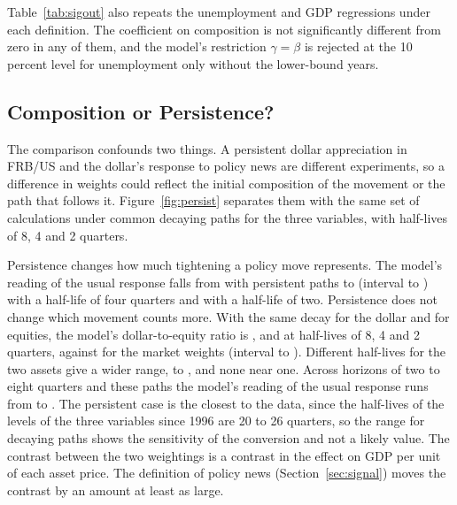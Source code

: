 \documentclass[11pt]{article}
\begin{document}
\begin{appendices}


Table~\ref{tab:sigout} also repeats the unemployment and GDP regressions under each definition. The coefficient on composition is not significantly different from zero in any of them, and the model's restriction $\gamma=\beta$ is rejected at the 10 percent level for unemployment only without the lower-bound years.


\subsection{Composition or Persistence?}\label{sec:persist}
The comparison confounds two things. A persistent dollar appreciation in FRB/US and the dollar's response to policy news are different experiments, so a difference in weights could reflect the initial composition of the movement or the path that follows it. Figure~\ref{fig:persist} separates them with the same set of calculations under common decaying paths for the three variables, with half-lives of 8, 4 and 2 quarters.

Persistence changes how much tightening a policy move represents. The model's reading of the usual response falls from  with persistent paths to  (interval  to ) with a half-life of four quarters and  with a half-life of two. Persistence does not change which movement counts more. With the same decay for the dollar and for equities, the model's dollar-to-equity ratio is ,  and  at half-lives of 8, 4 and 2 quarters, against  for the market weights (interval  to ). Different half-lives for the two assets give a wider range,  to , and none near one. Across horizons of two to eight quarters and these paths the model's reading of the usual response runs from  to . The persistent case is the closest to the data, since the half-lives of the levels of the three variables since 1996 are 20 to 26 quarters, so the range for decaying paths shows the sensitivity of the conversion and not a likely value. The contrast between the two weightings is a contrast in the effect on GDP per unit of each asset price. The definition of policy news (Section~\ref{sec:signal}) moves the contrast by an amount at least as large.


\end{appendices}
\end{document}
